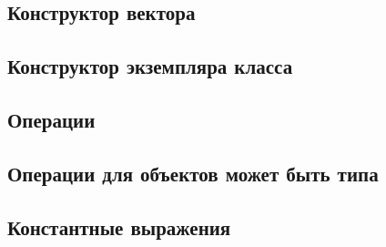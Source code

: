 \hypertarget{vector-composite}{%
\subsection{Конструктор вектора}\label{expr:vector-composite}}

\hypertarget{class-composite}{%
\subsection{Конструктор экземпляра класса}\label{expr:class-composite}}


\hypertarget{operators}{%
\subsection{Операции}\label{expr:operators}}

\hypertarget{mb-ops}{%
\subsection{Операции для объектов может быть типа}\label{expr:mb-ops}}


\hypertarget{const-expr}{%
\subsection{Константные выражения}\label{expr:const-expr}}